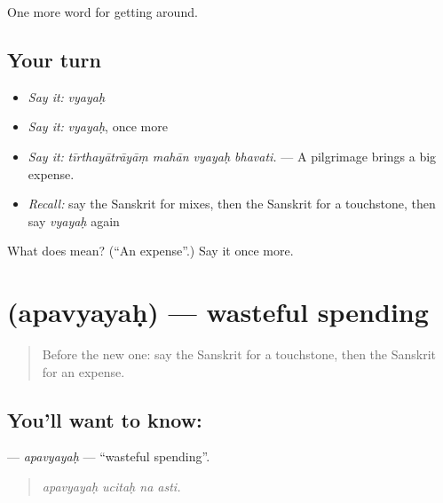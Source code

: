 \begin{grammarlens}[title={What you've built}]
One more word for getting around.
\end{grammarlens}

\subsection*{Your turn}
\begin{itemize}
\raggedright
  \item \emph{Say it:} \emph{vyayaḥ}
  \item \emph{Say it:} \emph{vyayaḥ}, once more
  \item \emph{Say it:} \emph{tīrthayātrāyāṃ mahān vyayaḥ bhavati.} — A pilgrimage brings a big expense.
  \item \emph{Recall:} say the Sanskrit for mixes, then the Sanskrit for a touchstone, then say \emph{vyayaḥ} again
\end{itemize}

\begin{tcolorbox}[breakable,colback=teal!4,colframe=teal!35!black,title={Before you move on}]
What does  mean? (\textquotedblleft{}An expense\textquotedblright{}.) Say it once more.
\end{tcolorbox}
\section[\texorpdfstring{\sk{अपव्ययः} (apavyayaḥ)}{अपव्ययः (apavyayaḥ)}]{ (apavyayaḥ) — wasteful spending}

\label{lesson:SA-C432-apavyayah}



\begin{quote}
Before the new one: say the Sanskrit for a touchstone, then the Sanskrit for an expense.
\end{quote}

\subsection*{You'll want to know: }
\textbf{} — \emph{apavyayaḥ} — \textquotedblleft{}wasteful spending\textquotedblright{}.

\begin{quote}
   
\end{quote}

\begin{quote}
\emph{apavyayaḥ ucitaḥ na asti.}
\end{quote}

